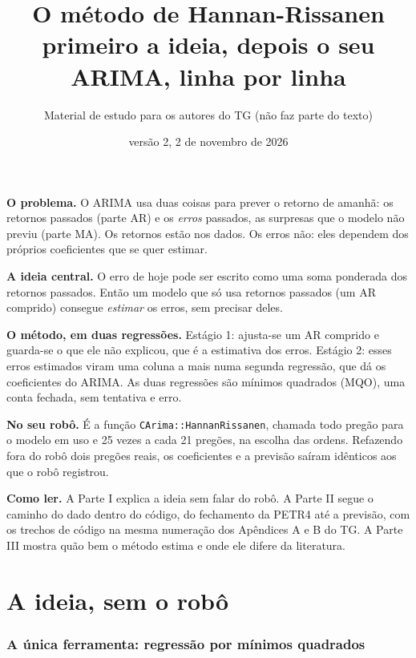 \documentclass[11pt,a4paper]{article}
\title{\textbf{O método de Hannan-Rissanen}\\[2pt]\large primeiro a ideia, depois o seu ARIMA, linha por linha}
\author{Material de estudo para os autores do TG (não faz parte do texto)}
\date{versão 2, 2 de novembro de 2026}
\begin{document}
\maketitle

\begin{ideia}
\textbf{O problema.} O ARIMA usa duas coisas para prever o retorno de amanhã: os retornos passados (parte AR) e os
\emph{erros} passados, as surpresas que o modelo não previu (parte MA). Os retornos estão nos dados. Os erros não:
eles dependem dos próprios coeficientes que se quer estimar.

\textbf{A ideia central.} O erro de hoje pode ser escrito como uma soma ponderada dos retornos passados. Então um
modelo que só usa retornos passados (um AR comprido) consegue \emph{estimar} os erros, sem precisar deles.

\textbf{O método, em duas regressões.} Estágio 1: ajusta-se um AR comprido e guarda-se o que ele não explicou, que é
a estimativa dos erros. Estágio 2: esses erros estimados viram uma coluna a mais numa segunda regressão, que dá os
coeficientes do ARIMA. As duas regressões são mínimos quadrados (MQO), uma conta fechada, sem tentativa e erro.

\textbf{No seu robô.} É a função \texttt{CArima::HannanRissanen}, chamada todo pregão para o modelo em uso e 25 vezes
a cada 21 pregões, na escolha das ordens. Refazendo fora do robô dois pregões reais, os coeficientes e a previsão
saíram idênticos aos que o robô registrou.

\textbf{Como ler.} A Parte I explica a ideia sem falar do robô. A Parte II segue o caminho do dado dentro do código,
do fechamento da PETR4 até a previsão, com os trechos de código na mesma numeração dos Apêndices A e B do TG. A
Parte III mostra quão bem o método estima e onde ele difere da literatura.
\end{ideia}

\tableofcontents

\part{A ideia, sem o robô}

\section{A única ferramenta: regressão por mínimos quadrados}\label{sec:mqo}
\end{document}
